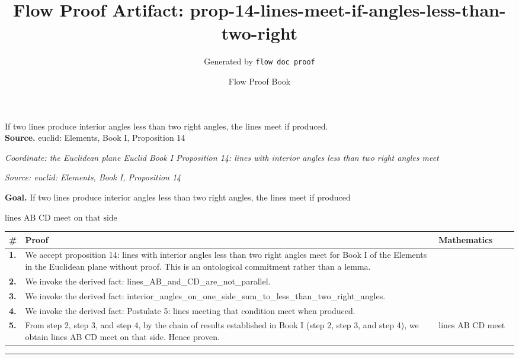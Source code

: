 \documentclass[11pt]{article}
\title{Flow Proof Artifact: prop-14-lines-meet-if-angles-less-than-two-right}
\author{Generated by \texttt{flow doc proof}}
\date{Flow Proof Book}
\theoremstyle{definition}
\begin{document}
\maketitle
If two lines produce interior angles less than two right angles, the lines meet if produced.\\[0.5em]
\textbf{Source.} euclid: Elements, Book I, Proposition 14\\[0.5em]
\bigskip
{}\par
\smallskip\noindent\textit{Coordinate: the Euclidean plane \cdot Euclid Book I \cdot Proposition 14: lines with interior angles less than two right angles meet}\par
\smallskip\noindent\textit{Source: euclid: Elements, Book I, Proposition 14}\par
\medskip
\noindent\textbf{Goal.} If two lines produce interior angles less than two right angles, the lines meet if produced\par
\noindent$\displaystyle \text{lines AB CD meet on that side}$\par
\medskip
\noindent
\begin{tabular}{@{} >{\raggedright\arraybackslash}p{} >{\raggedright\arraybackslash}p{} >{\raggedleft\arraybackslash}p{} @{}}
\textbf{\#} & \textbf{Proof} & \textbf{Mathematics} \\
\midrule
\textbf{1.} & We accept proposition 14: lines with interior angles less than two right angles meet for Book I of the Elements in the Euclidean plane without proof. This is an ontological commitment rather than a lemma. & \\[0.45em]
\textbf{2.} & We invoke the derived fact: lines\_AB\_and\_CD\_are\_not\_parallel. & \\[0.45em]
\textbf{3.} & We invoke the derived fact: interior\_angles\_on\_one\_side\_sum\_to\_less\_than\_two\_right\_angles. & \\[0.45em]
\textbf{4.} & We invoke the derived fact: Postulate 5: lines meeting that condition meet when produced. & \\[0.45em]
\textbf{5.} & From step 2, step 3, and step 4, by the chain of results established in Book I (step 2, step 3, and step 4), we obtain lines AB CD meet on that side. Hence proven. & $\displaystyle \text{lines AB CD meet on that side}$ \\[0.45em]
\bottomrule
\end{tabular}
\label{thm:Geometry-Euclid Book I-proposition_14_lines_with_interior_angles_less_than_two_right_angles_meet}
\par\medskip\hrule
\end{document}
